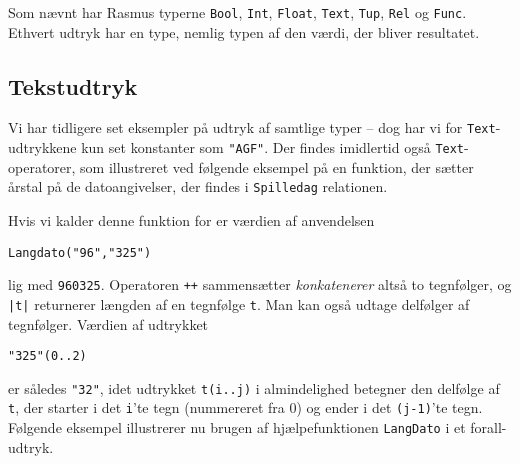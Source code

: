 \documentclass{article}
\newcounter{eks}
\begin{document}
Som n\ae{}vnt har {\sc Rasmus} typerne
\verb"Bool", \verb"Int", \verb"Float", \verb"Text", \verb"Tup", \verb"Rel" og \verb"Func".
Ethvert udtryk har en type, nemlig typen af den v\ae{}rdi, der
bliver resultatet. 

\subsection{Tekstudtryk}
Vi har tidligere set eksempler p\aa{} udtryk af samtlige typer
-- dog har vi for \verb"Text"-udtrykkene kun set konstanter som \verb$"AGF"$.
Der findes imid\-lertid ogs\aa{} \verb"Text"-operatorer, som illustreret ved
f\o{}lgende eksempel p\aa{} en funktion, der s\ae{}tter \aa{}rstal
p\aa{} de datoangivelser, der findes i \verb"Spilledag" relationen.


Hvis vi kalder denne funktion for  er
v\ae{}rdien af anvendelsen
\begin{center}
\verb$Langdato("96","325")$
\end{center}
lig med \verb"960325". Operatoren \verb"++" sammens\ae{}tter 
{\em konkatenerer\/} alts\aa{}
to tegnf\o{}lger, og \verb"|t|" returnerer l\ae{}ngden af en tegnf\o{}lge
\verb"t". Man kan ogs\aa{} udtage delf\o{}lger af tegnf\o{}lger. V\ae{}rdien
af udtrykket 
\begin{center}
\verb$"325"(0..2)$
\end{center}
er s\aa{}ledes \verb$"32"$, idet udtrykket \verb"t(i..j)" i almindelighed
betegner den delf\o{}lge af \verb"t", der starter i det \verb"i"'te tegn
(nummereret fra 0) og ender i det \verb"(j-1)"'te tegn. F\o{}lgende
eksempel illustrerer nu brugen af hj\ae{}lpefunktionen \verb"LangDato"
i et forall-udtryk.
\end{document}
